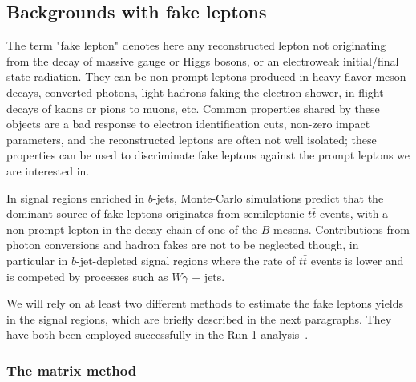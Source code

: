 \subsection{Backgrounds with fake leptons}
\label{sec:bkg_fakes}

The term "fake lepton" denotes here any reconstructed lepton not originating 
from the decay of massive gauge or Higgs bosons, or an electroweak initial/final state radiation. 
They can be non-prompt leptons produced in heavy flavor meson decays, converted photons, 
light hadrons faking the electron shower, in-flight decays of kaons or pions to muons, etc.  
Common properties shared by these objects are a bad response to electron identification cuts, 
non-zero impact parameters, and the reconstructed leptons are often not well isolated; 
these properties can be used to discriminate fake leptons against the prompt leptons we are interested in. 

In signal regions enriched in $b$-jets, Monte-Carlo simulations predict that the dominant source of fake leptons originates 
from semileptonic $t\bar{t}$ events, with a non-prompt lepton in the decay chain of one of the $B$ mesons. 
Contributions from photon conversions and hadron fakes are not to be neglected though, 
in particular in $b$-jet-depleted signal regions where the rate of $t\bar{t}$ events is lower 
and is competed by processes such as $W\gamma$ + jets. 

We will rely on at least two different methods to estimate the fake leptons yields in the signal regions, 
which are briefly described in the next paragraphs. They have both been employed successfully in the Run-1 analysis~\cite{noteSS3L}. 

\subsubsection{The matrix method}
\label{sec:bkg_fakes_matrixmethod}

